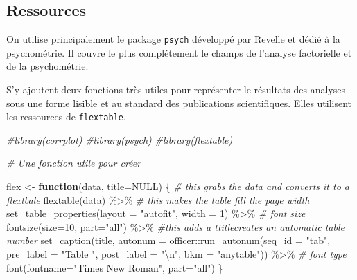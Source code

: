 \documentclass[
]{book}
\newenvironment{Shaded}{\begin{snugshade}}{\end{snugshade}}
\newcommand{\AttributeTok}[1]{\textcolor[rgb]{0.77,0.63,0.00}{#1}}
\newcommand{\CommentTok}[1]{\textcolor[rgb]{0.56,0.35,0.01}{\textit{#1}}}
\newcommand{\ConstantTok}[1]{\textcolor[rgb]{0.00,0.00,0.00}{#1}}
\newcommand{\ControlFlowTok}[1]{\textcolor[rgb]{0.13,0.29,0.53}{\textbf{#1}}}
\newcommand{\DecValTok}[1]{\textcolor[rgb]{0.00,0.00,0.81}{#1}}
\newcommand{\FunctionTok}[1]{\textcolor[rgb]{0.00,0.00,0.00}{#1}}
\newcommand{\NormalTok}[1]{#1}
\newcommand{\OtherTok}[1]{\textcolor[rgb]{0.56,0.35,0.01}{#1}}
\newcommand{\SpecialCharTok}[1]{\textcolor[rgb]{0.00,0.00,0.00}{#1}}
\newcommand{\StringTok}[1]{\textcolor[rgb]{0.31,0.60,0.02}{#1}}
\begin{document}
\hypertarget{ressources}{%
\subsection{Ressources}\label{ressources}}

On utilise principalement le package \texttt{psych} développé par Revelle et dédié à la psychométrie. Il couvre le plus complétement le champs de l'analyse factorielle et de la psychométrie.

S'y ajoutent deux fonctions très utiles pour représenter le résultats des analyses sous une forme lisible et au standard des publications scientifiques. Elles utilisent les ressources de \texttt{flextable}.

\begin{Shaded}
\begin{Highlighting}[]
\CommentTok{\#library(corrplot)}
\CommentTok{\#library(psych)}
\CommentTok{\#library(flextable)}


\CommentTok{\# Une fonction utile pour créer }


\NormalTok{flex }\OtherTok{\textless{}{-}} \ControlFlowTok{function}\NormalTok{(data, }\AttributeTok{title=}\ConstantTok{NULL}\NormalTok{) \{}
  \CommentTok{\# this grabs the data and converts it to a flextbale}
  \FunctionTok{flextable}\NormalTok{(data) }\SpecialCharTok{\%\textgreater{}\%}
  \CommentTok{\# this makes the table fill the page width}
  \FunctionTok{set\_table\_properties}\NormalTok{(}\AttributeTok{layout =} \StringTok{"autofit"}\NormalTok{, }\AttributeTok{width =} \DecValTok{1}\NormalTok{) }\SpecialCharTok{\%\textgreater{}\%}
  \CommentTok{\# font size}
  \FunctionTok{fontsize}\NormalTok{(}\AttributeTok{size=}\DecValTok{10}\NormalTok{, }\AttributeTok{part=}\StringTok{"all"}\NormalTok{) }\SpecialCharTok{\%\textgreater{}\%}
    \CommentTok{\#this adds a ttitlecreates an automatic table number}
      \FunctionTok{set\_caption}\NormalTok{(title, }
                  \AttributeTok{autonum =}\NormalTok{ officer}\SpecialCharTok{::}\FunctionTok{run\_autonum}\NormalTok{(}\AttributeTok{seq\_id =} \StringTok{"tab"}\NormalTok{, }
                                                 \AttributeTok{pre\_label =} \StringTok{"Table "}\NormalTok{, }
                                                 \AttributeTok{post\_label =} \StringTok{"}\SpecialCharTok{\textbackslash{}n}\StringTok{"}\NormalTok{, }
                                                 \AttributeTok{bkm =} \StringTok{"anytable"}\NormalTok{)) }\SpecialCharTok{\%\textgreater{}\%}
  \CommentTok{\# font type}
  \FunctionTok{font}\NormalTok{(}\AttributeTok{fontname=}\StringTok{"Times New Roman"}\NormalTok{, }\AttributeTok{part=}\StringTok{"all"}\NormalTok{)}
\NormalTok{\}}


\end{Highlighting}
\end{Shaded}
\end{document}
